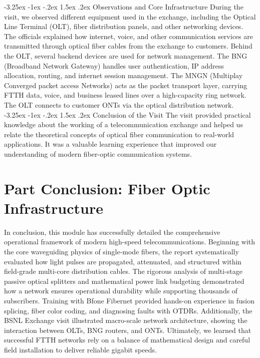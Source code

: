 \documentclass[11pt,a4paper]{report}
\makeatletter
\renewcommand{\section}{\@startsection{section}{1}{\z@}%
  {-3.25ex \@plus -1ex \@minus -.2ex}%
  {1.5ex \@plus.2ex}%
  {\normalfont\Large\bfseries\color{primaryColor}}}
\makeatother
\begin{document}
\section{Observations and Core Infrastructure}
During the visit, we observed different equipment used in the exchange, including the Optical Line Terminal (OLT), fiber distribution panels, and other networking devices. The officials explained how internet, voice, and other communication services are transmitted through optical fiber cables from the exchange to customers. Behind the OLT, several backend devices are used for network management. The BNG (Broadband Network Gateway) handles user authentication, IP address allocation, routing, and internet session management. The MNGN (Multiplay Converged packet access Networks) acts as the packet transport layer, carrying FTTH data, voice, and business leased lines over a high-capacity ring network. The OLT connects to customer ONTs via the optical distribution network.
\section{Conclusion of the Visit}
The visit provided practical knowledge about the working of a telecommunication exchange and helped us relate the theoretical concepts of optical fiber communication to real-world applications. It was a valuable learning experience that improved our understanding of modern fiber-optic communication systems.
\chapter*{Part Conclusion: Fiber Optic Infrastructure}
In conclusion, this module has successfully detailed the comprehensive operational framework of modern high-speed telecommunications. Beginning with the core waveguiding physics of single-mode fibers, the report systematically evaluated how light pulses are propagated, attenuated, and structured within field-grade multi-core distribution cables. The rigorous analysis of multi-stage passive optical splitters and mathematical power link budgeting demonstrated how a network ensures operational durability while supporting thousands of subscribers. Training with Bfone Fibernet provided hands-on experience in fusion splicing, fiber color coding, and diagnosing faults with OTDRs. Additionally, the BSNL Exchange visit illustrated macro-scale network architecture, showing the interaction between OLTs, BNG routers, and ONTs. Ultimately, we learned that successful FTTH networks rely on a balance of mathematical design and careful field installation to deliver reliable gigabit speeds.
\end{document}
